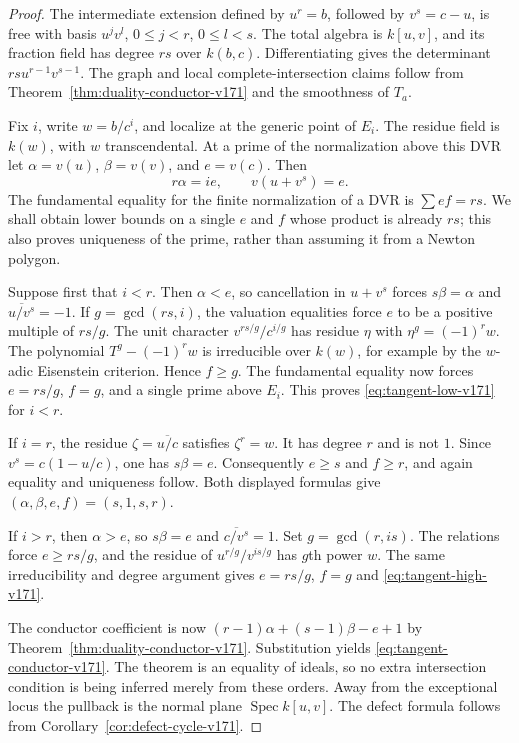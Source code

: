 \documentclass[11pt,reqno]{amsart}
\numberwithin{equation}{section}
\theoremstyle{definition}\newtheorem{definition}[theorem]{Definition}
\theoremstyle{remark}\newtheorem{remark}[theorem]{Remark}
\DeclareMathOperator{\Spec}{Spec}\DeclareMathOperator{\PGL}{PGL}
\begin{document}
\begin{proof}
The intermediate extension defined by $u^r=b$, followed by
$v^s=c-u$, is free with basis $u^jv^l$, $0\leq j<r$, $0\leq l<s$.
The total algebra is $k[u,v]$, and its fraction field has degree $rs$
over $k(b,c)$. Differentiating gives the determinant
$rsu^{r-1}v^{s-1}$. The graph and local complete-intersection claims
follow from Theorem~\ref{thm:duality-conductor-v171} and the smoothness
of $T_a$.

Fix $i$, write $w=b/c^i$, and localize at the generic point of $E_i$.
The residue field is $k(w)$, with $w$ transcendental. At a prime of the
normalization above this DVR let $\alpha=v(u)$, $\beta=v(v)$, and
$e=v(c)$. Then
\begin{equation}\label{eq:tangent-valuation-relations-v171}
 r\alpha=ie,\qquad v(u+v^s)=e.
\end{equation}
The fundamental equality for the finite normalization of a DVR is
$\sum ef=rs$. We shall obtain lower bounds on a single $e$ and $f$
whose product is already $rs$; this also proves uniqueness of the
prime, rather than assuming it from a Newton polygon.

Suppose first that $i<r$. Then $\alpha<e$, so cancellation in $u+v^s$
forces $s\beta=\alpha$ and $\overline{u/v^s}=-1$. If $g=\gcd(rs,i)$,
the valuation equalities force $e$ to be a positive multiple of $rs/g$.
The unit character $v^{rs/g}/c^{i/g}$ has residue $\eta$ with
$\eta^g=(-1)^r w$. The polynomial $T^g-(-1)^r w$ is irreducible over
$k(w)$, for example by the $w$-adic Eisenstein criterion. Hence $f\geq g$.
The fundamental equality now forces $e=rs/g$, $f=g$, and a single
prime above $E_i$. This proves \eqref{eq:tangent-low-v171} for $i<r$.

If $i=r$, the residue $\zeta=\overline{u/c}$ satisfies $\zeta^r=w$.
It has degree $r$ and is not $1$. Since
$v^s=c(1-u/c)$, one has $s\beta=e$. Consequently $e\geq s$ and
$f\geq r$, and again equality and uniqueness follow. Both displayed
formulas give $(\alpha,\beta,e,f)=(s,1,s,r)$.

If $i>r$, then $\alpha>e$, so $s\beta=e$ and
$\overline{c/v^s}=1$. Set $g=\gcd(r,is)$. The relations force
$e\geq rs/g$, and the residue of $u^{r/g}/v^{is/g}$ has $g$th power
$w$. The same irreducibility and degree argument gives
$e=rs/g$, $f=g$ and \eqref{eq:tangent-high-v171}.

The conductor coefficient is now
$(r-1)\alpha+(s-1)\beta-e+1$ by
Theorem~\ref{thm:duality-conductor-v171}. Substitution yields
\eqref{eq:tangent-conductor-v171}. The theorem is an equality of ideals,
so no extra intersection condition is being inferred merely from
these orders. Away from the exceptional locus the pullback is the
normal plane $\Spec k[u,v]$. The defect formula follows from
Corollary~\ref{cor:defect-cycle-v171}.
\end{proof}
\end{document}
